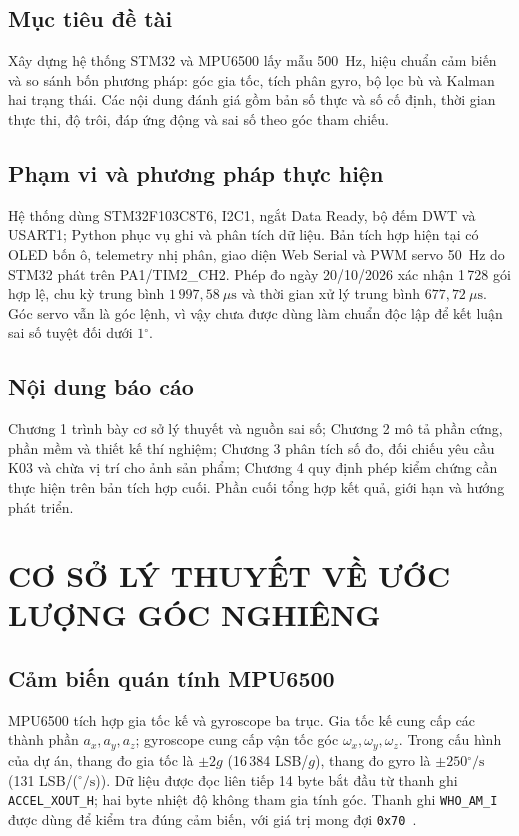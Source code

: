 \documentclass[14pt,a4paper,oneside]{extreport}
\newcommand{\degree}{\ensuremath{^{\circ}}}
\begin{document}
\section*{Mục tiêu đề tài}
Xây dựng hệ thống STM32 và MPU6500 lấy mẫu 500~Hz, hiệu chuẩn cảm biến và so sánh bốn phương pháp: góc gia tốc, tích phân gyro, bộ lọc bù và Kalman hai trạng thái. Các nội dung đánh giá gồm bản số thực và số cố định, thời gian thực thi, độ trôi, đáp ứng động và sai số theo góc tham chiếu.

\section*{Phạm vi và phương pháp thực hiện}
Hệ thống dùng STM32F103C8T6, I2C1, ngắt Data Ready, bộ đếm DWT và USART1; Python phục vụ ghi và phân tích dữ liệu. Bản tích hợp hiện tại có OLED bốn ô, telemetry nhị phân, giao diện Web Serial và PWM servo 50~Hz do STM32 phát trên PA1/TIM2\_CH2. Phép đo ngày 20/10/2026 xác nhận 1\,728 gói hợp lệ, chu kỳ trung bình $1\,997{,}58~\mu\mathrm{s}$ và thời gian xử lý trung bình $677{,}72~\mu\mathrm{s}$. Góc servo vẫn là góc lệnh, vì vậy chưa được dùng làm chuẩn độc lập để kết luận sai số tuyệt đối dưới $1\degree$.

\section*{Nội dung báo cáo}
Chương 1 trình bày cơ sở lý thuyết và nguồn sai số; Chương 2 mô tả phần cứng, phần mềm và thiết kế thí nghiệm; Chương 3 phân tích số đo, đối chiếu yêu cầu K03 và chừa vị trí cho ảnh sản phẩm; Chương 4 quy định phép kiểm chứng cần thực hiện trên bản tích hợp cuối. Phần cuối tổng hợp kết quả, giới hạn và hướng phát triển.

\clearpage
\chapter{CƠ SỞ LÝ THUYẾT VỀ ƯỚC LƯỢNG GÓC NGHIÊNG}

\section{Cảm biến quán tính MPU6500}
MPU6500 tích hợp gia tốc kế và gyroscope ba trục. Gia tốc kế cung cấp các thành phần $a_x,a_y,a_z$; gyroscope cung cấp vận tốc góc $\omega_x,\omega_y,\omega_z$. Trong cấu hình của dự án, thang đo gia tốc là $\pm2g$ (16\,384 LSB/$g$), thang đo gyro là $\pm250\degree/\mathrm{s}$ (131 LSB/($\degree/\mathrm{s}$)). Dữ liệu được đọc liên tiếp 14 byte bắt đầu từ thanh ghi \texttt{ACCEL\_XOUT\_H}; hai byte nhiệt độ không tham gia tính góc. Thanh ghi \texttt{WHO\_AM\_I} được dùng để kiểm tra đúng cảm biến, với giá trị mong đợi \texttt{0x70}~\cite{mpu_reg}.
\end{document}
